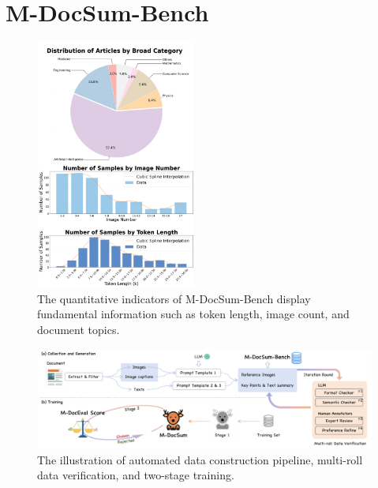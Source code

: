 \section{M-DocSum-Bench}


\begin{figure}[t]
\centering
\includegraphics[width=0.47\textwidth]{figs/statis-shu}
\caption{The quantitative indicators of M-DocSum-Bench display fundamental information such as token length, image count, and document topics.}
\label{fig:1_statisticians}
\end{figure}

\begin{figure}[t]
\centering
\includegraphics[width=\textwidth]{figs/fig_main}
\caption{The illustration of automated data construction pipeline, multi-roll data verification, and two-stage training.}
\label{fig-main}
\end{figure}

